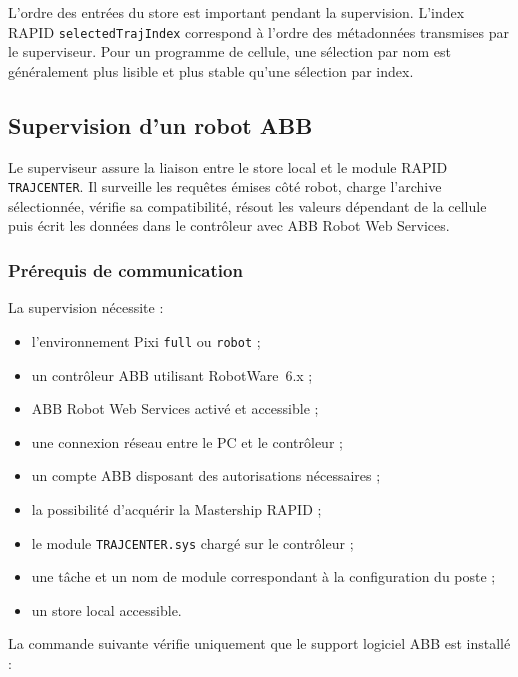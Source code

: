 \documentclass{rapportENSAM}
\begin{document}
L'ordre des entrées du store est important pendant la supervision. L'index
RAPID \texttt{selectedTrajIndex} correspond à l'ordre des métadonnées
transmises par le superviseur. Pour un programme de cellule, une sélection par
nom est généralement plus lisible et plus stable qu'une sélection par index.



\subsection{Supervision d'un robot ABB}
\label{subsec:pc-robot-supervision}

Le superviseur assure la liaison entre le store local et le module RAPID
\texttt{TRAJCENTER}. Il surveille les requêtes émises côté robot, charge
l'archive sélectionnée, vérifie sa compatibilité, résout les valeurs dépendant
de la cellule puis écrit les données dans le contrôleur avec ABB Robot Web
Services.

\subsubsection{Prérequis de communication}
\label{subsubsec:pc-robot-prerequisites}

La supervision nécessite :

\begin{itemize}
    \item l'environnement Pixi \texttt{full} ou \texttt{robot} ;
    \item un contrôleur ABB utilisant RobotWare~6.x ;
    \item ABB Robot Web Services activé et accessible ;
    \item une connexion réseau entre le PC et le contrôleur ;
    \item un compte ABB disposant des autorisations nécessaires ;
    \item la possibilité d'acquérir la Mastership RAPID ;
    \item le module \texttt{TRAJCENTER.sys} chargé sur le contrôleur ;
    \item une tâche et un nom de module correspondant à la configuration du
    poste ;
    \item un store local accessible.
\end{itemize}

La commande suivante vérifie uniquement que le support logiciel ABB est
installé :
\end{document}
